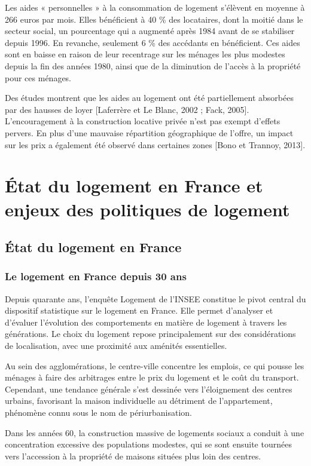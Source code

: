 \documentclass[a4paper, 12pt]{report}
\begin{document}
Les aides « personnelles » à la consommation de logement s'élèvent en moyenne à 266 euros par mois. Elles bénéficient à 40 \% des locataires, dont la moitié dans le secteur social, un pourcentage qui a augmenté après 1984 avant de se stabiliser depuis 1996. En revanche, seulement 6 \% des accédants en bénéficient. Ces aides sont en baisse en raison de leur recentrage sur les ménages les plus modestes depuis la fin des années 1980, ainsi que de la diminution de l'accès à la propriété pour ces ménages.

Des études montrent que les aides au logement ont été partiellement absorbées par des hausses de loyer [Laferrère et Le Blanc, 2002 ; Fack, 2005]. L’encouragement à la construction locative privée n’est pas exempt d’effets pervers. En plus d'une mauvaise répartition géographique de l'offre, un impact sur les prix a également été observé dans certaines zones [Bono et Trannoy, 2013].

\chapter{État du logement en France et enjeux des politiques de logement}

\section{État du logement en France}

\subsection{Le logement en France depuis 30 ans}

Depuis quarante ans, l’enquête Logement de l’INSEE constitue le pivot central du dispositif statistique sur le logement en France. Elle permet d'analyser et d'évaluer l'évolution des comportements en matière de logement à travers les générations. Le choix du logement repose principalement sur des considérations de localisation, avec une proximité aux aménités essentielles. 

Au sein des agglomérations, le centre-ville concentre les emplois, ce qui pousse les ménages à faire des arbitrages entre le prix du logement et le coût du transport. Cependant, une tendance générale s'est dessinée vers l'éloignement des centres urbains, favorisant la maison individuelle au détriment de l'appartement, phénomène connu sous le nom de périurbanisation. 

Dans les années 60, la construction massive de logements sociaux a conduit à une concentration excessive des populations modestes, qui se sont ensuite tournées vers l'accession à la propriété de maisons situées plus loin des centres. 
\end{document}
